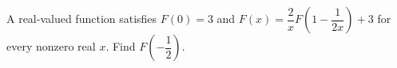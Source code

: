 A real-valued function satisfies $F(0)=3$ and $F(x)=\dfrac{2}{x}F(1-\dfrac{1}{2x})+3$ for every nonzero real $x$. Find $F(-\dfrac{1}{2})$.
